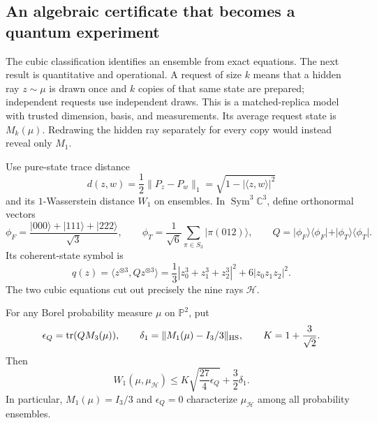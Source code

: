 \subsection{An algebraic certificate that becomes a quantum experiment}
\label{geo:hesse-cert}

The cubic classification identifies an ensemble from exact equations.
The next result is quantitative and operational. A request of size \(k\)
means that a hidden ray \(z\sim\mu\) is drawn once and \(k\) copies of that
same state are prepared; independent requests use independent draws.
This is a matched-replica model with trusted dimension, basis, and
measurements. Its average request state is \(M_k(\mu)\). Redrawing the
hidden ray separately for every copy would instead reveal only \(M_1\).

Use pure-state trace distance
\[
 d(z,w)=\frac12\|P_z-P_w\|_1
       =\sqrt{1-|\langle z,w\rangle|^2}
\]
and its \(1\)-Wasserstein distance \(W_1\) on ensembles.
In \(\operatorname{Sym}^3\mathbb C^3\), define orthonormal vectors
\[
 \phi_F=\frac{|000\rangle+|111\rangle+|222\rangle}{\sqrt3},\qquad
 \phi_T=\frac1{\sqrt6}\sum_{\pi\in S_3}|\pi(012)\rangle,\qquad
 Q=|\phi_F\rangle\langle\phi_F|+|\phi_T\rangle\langle\phi_T|.
\]
Its coherent-state symbol is
\begin{equation}
 q(z)=\langle z^{\otimes3},Qz^{\otimes3}\rangle
 =\frac13|z_0^3+z_1^3+z_2^3|^2+6|z_0z_1z_2|^2.
 \label{geo:q}
\end{equation}
The two cubic equations cut out precisely the nine rays \(\mathcal H\).


\begin{theorem}
\label{geo:hesse-bound}
For any Borel probability measure \(\mu\) on \(\mathbb P^2\), put
\[
 \epsilon_Q=\operatorname{tr}(QM_3(\mu)),\qquad
 \delta_1=\|M_1(\mu)-I_3/3\|_{\rm HS},\qquad K=1+\frac3{\sqrt2}.
\]
Then
\begin{equation}
 W_1(\mu,\mu_{\mathcal H})
 \le K\sqrt{\frac{27}{4}\epsilon_Q}+\frac32\delta_1.
 \label{geo:robust}
\end{equation}
In particular, \(M_1(\mu)=I_3/3\) and \(\epsilon_Q=0\) characterize
\(\mu_{\mathcal H}\) among all probability ensembles.
\end{theorem}

